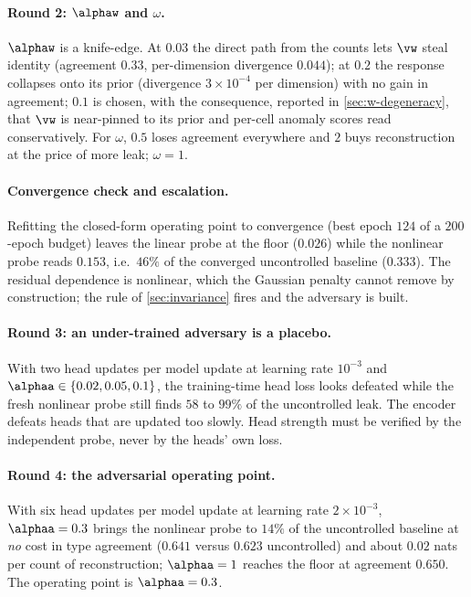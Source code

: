 \paragraph{Round 2: $\alphaw$ and $\omega$.} $\alphaw$ is a knife-edge. At $0.03$ the direct path from the counts lets $\vw$ steal identity (agreement $0.33$, per-dimension divergence $0.044$); at $0.2$ the response collapses onto its prior (divergence $3\times10^{-4}$ per dimension) with no gain in agreement; $0.1$ is chosen, with the consequence, reported in \cref{sec:w-degeneracy}, that $\vw$ is near-pinned to its prior and per-cell anomaly scores read conservatively. For $\omega$, $0.5$ loses agreement everywhere and $2$ buys reconstruction at the price of more leak; $\omega = 1$. 

\paragraph{Convergence check and escalation.} Refitting the closed-form operating point to convergence (best epoch $124$ of a $200$-epoch budget) leaves the linear probe at the floor ($0.026$) while the nonlinear probe reads $0.153$, i.e.\ $46\%$ of the converged uncontrolled baseline ($0.333$). The residual dependence is nonlinear, which the Gaussian penalty cannot remove by construction; the rule of \cref{sec:invariance} fires and the adversary is built. 

\paragraph{Round 3: an under-trained adversary is a placebo.} With two head updates per model update at learning rate $10^{-3}$ and $\alphaa \in \{0.02, 0.05, 0.1\}$, the training-time head loss looks defeated while the fresh nonlinear probe still finds $58$ to $99\%$ of the uncontrolled leak. The encoder defeats heads that are updated too slowly. Head strength must be verified by the independent probe, never by the heads' own loss. 

\paragraph{Round 4: the adversarial operating point.} With six head updates per model update at learning rate $2\times10^{-3}$, $\alphaa = 0.3$ brings the nonlinear probe to $14\%$ of the uncontrolled baseline at \emph{no} cost in type agreement ($0.641$ versus $0.623$ uncontrolled) and about $0.02$ nats per count of reconstruction; $\alphaa = 1$ reaches the floor at agreement $0.650$. The operating point is $\alphaa = 0.3$. 

